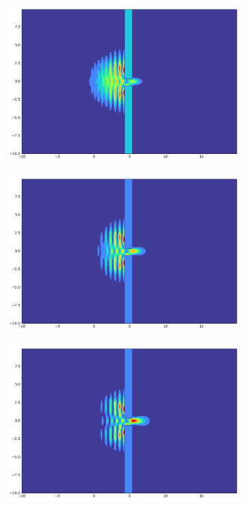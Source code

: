 \begin{figure}[h!]
\begin{subfigure}{0.3\linewidth}
    \end{subfigure}
    \begin{subfigure}{0.3\linewidth}
        \includegraphics[width=\linewidth]{10/300}
    \end{subfigure}
    \begin{subfigure}{0.3\linewidth}
        \includegraphics[width=\linewidth]{10/400}
    \end{subfigure}
    \begin{subfigure}{0.3\linewidth}
        \includegraphics[width=\linewidth]{10/500}

\end{subfigure}
\end{figure}
